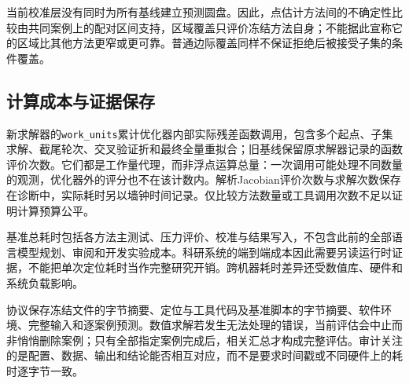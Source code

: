 当前校准层没有同时为所有基线建立预测圆盘。因此，点估计方法间的不确定性比较由共同案例上的配对区间支持，区域覆盖只评价冻结方法自身；不能据此宣称它的区域比其他方法更窄或更可靠。普通边际覆盖同样不保证拒绝后被接受子集的条件覆盖。

\subsection{计算成本与证据保存}

新求解器的\texttt{work\_units}累计优化器内部实际残差函数调用，包含多个起点、子集求解、截尾轮次、交叉验证折和最终全量重拟合；旧基线保留原求解器记录的函数评价次数。它们都是工作量代理，而非浮点运算总量：一次调用可能处理不同数量的观测，优化器外的评分也不在该计数内。解析Jacobian评价次数与求解次数保存在诊断中，实际耗时另以墙钟时间记录。仅比较方法数量或工具调用次数不足以证明计算预算公平。

基准总耗时包括各方法主测试、压力评价、校准与结果写入，不包含此前的全部语言模型规划、审阅和开发实验成本。科研系统的端到端成本因此需要另读运行时证据，不能把单次定位耗时当作完整研究开销。跨机器耗时差异还受数值库、硬件和系统负载影响。

协议保存冻结文件的字节摘要、定位与工具代码及基准脚本的字节摘要、软件环境、完整输入和逐案例预测。数值求解若发生无法处理的错误，当前评估会中止而非悄悄删除案例；只有全部指定案例完成后，相关汇总才构成完整评估。审计关注的是配置、数据、输出和结论能否相互对应，而不是要求时间戳或不同硬件上的耗时逐字节一致。
